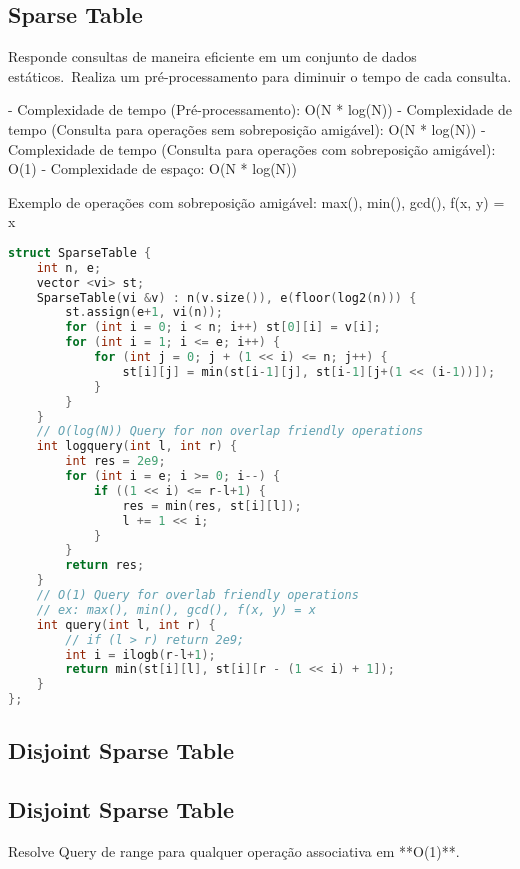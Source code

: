 \documentclass[11pt, a4paper, twoside]{article}
\begin{document}
\subsection{Sparse Table}



Responde consultas de maneira eficiente em um conjunto de dados estáticos.\
Realiza um pré-processamento para diminuir o tempo de cada consulta.

- Complexidade de tempo (Pré-processamento): O(N * log(N))
- Complexidade de tempo (Consulta para operações sem sobreposição amigável): O(N * log(N))
- Complexidade de tempo (Consulta para operações com sobreposição amigável): O(1)
- Complexidade de espaço: O(N * log(N))

Exemplo de operações com sobreposição amigável: max(), min(), gcd(), f(x, y) = x



\begin{lstlisting}[language=C++]
struct SparseTable {
    int n, e;
    vector <vi> st;
    SparseTable(vi &v) : n(v.size()), e(floor(log2(n))) {
        st.assign(e+1, vi(n));
        for (int i = 0; i < n; i++) st[0][i] = v[i];
        for (int i = 1; i <= e; i++) {
            for (int j = 0; j + (1 << i) <= n; j++) {
                st[i][j] = min(st[i-1][j], st[i-1][j+(1 << (i-1))]);
            }
        }
    }
    // O(log(N)) Query for non overlap friendly operations
    int logquery(int l, int r) {
        int res = 2e9;
        for (int i = e; i >= 0; i--) {
            if ((1 << i) <= r-l+1) {
                res = min(res, st[i][l]);
                l += 1 << i;
            }
        }
        return res;
    }
    // O(1) Query for overlab friendly operations
    // ex: max(), min(), gcd(), f(x, y) = x
    int query(int l, int r) {
        // if (l > r) return 2e9;
        int i = ilogb(r-l+1);
        return min(st[i][l], st[i][r - (1 << i) + 1]);
    }
};
\end{lstlisting}

\subsection{Disjoint Sparse Table}

\subsection{Disjoint Sparse Table}



Resolve Query de range para qualquer operação associativa em **O(1)**.
\end{document}
